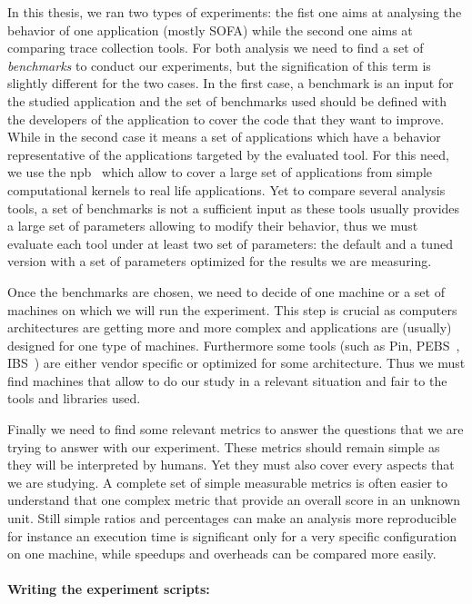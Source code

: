 In this thesis, we ran two types of experiments: the fist one aims at
analysing the behavior of one application (mostly \gls{SOFA}) while the second
one aims at comparing trace collection tools. For both analysis we need to
find a set of \emph{benchmarks} to conduct our experiments, but the signification
of this term is slightly different for the two cases. In the first case, a
benchmark is an input for the studied application and the set of benchmarks
used should be defined with the developers of the application to cover the
code that they want to improve.
While in the second case it means a set of applications which have a behavior
representative of the applications targeted by the evaluated tool. For this
need, we use the \gls{npb}~\cite{Jin99NPBOpenMP} which allow
to cover a large set of applications from simple computational kernels to real
life applications.
Yet to compare several analysis tools, a set of benchmarks
is not a sufficient input as these tools usually provides a large set of
parameters allowing to modify their behavior, thus we must evaluate each tool
under at least two set of parameters: the default and a tuned version with a
set of parameters optimized for the results we are measuring.

Once the benchmarks are chosen, we need to decide of one machine or a set of
machines on which we will run the experiment. This step is crucial as
computers architectures are getting more and more complex  and applications are (usually) designed for one type of machines.
Furthermore some tools (such as \gls{Pin},
\gls{PEBS}~\cite{Levinthal09Performance},
\gls{IBS}~\cite{Drongowski07Instructionbased}) are either vendor
specific or optimized for some architecture. Thus we must find machines that
allow to do our study in a relevant situation and fair to the tools and
libraries used.

Finally we need to find some relevant metrics to answer the questions that we
are trying to answer with our experiment. These metrics should remain
simple as they will be interpreted by humans. Yet they must also cover every
aspects that we are studying. A complete set of simple measurable metrics is
often easier to understand that one complex metric that provide an overall
score in an unknown unit. Still simple ratios and percentages can make an
analysis more reproducible for instance an execution time is significant only
for a very specific configuration on one machine, while speedups and overheads
can be compared more easily.


\paragraph{Writing the experiment scripts:}

